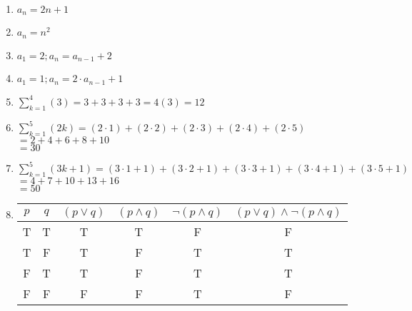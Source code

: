     \begin{enumerate}
        \item   $a_{n} = 2n+1$
        \item   $a_{n} = n^{2}$
        \item   $a_{1} = 2; a_{n} = a_{n-1} + 2$
        \item   $a_{1} = 1; a_{n} = 2 \cdot a_{n-1} + 1$
        
        \item   $ \sum_{k=1}^{4}(3) = 3 + 3 + 3 + 3 = 4(3) = 12$
        
        \item   $ \sum_{k=1}^{5}(2k) = (2 \cdot 1) + (2 \cdot 2) + (2 \cdot 3) + (2 \cdot 4) + (2 \cdot 5) $ \\
                $ = 2 + 4 + 6 + 8 + 10$ \\ $= 30$
        
        \item   $ \sum_{k=1}^{5}(3k+1) = (3 \cdot 1 + 1) + (3 \cdot 2 + 1) + (3 \cdot 3 + 1) + (3 \cdot 4 + 1) + (3 \cdot 5 + 1)$ \\
                $ = 4 + 7 + 10 + 13 + 16 $ \\ $ = 50$

        \item   
            \begin{tabular}{c c | c | c | c | c}
                $p$ & $q$
                    & $(p \lor q)$
                    & $(p \land q)$
                    & $\neg (p \land q)$
                    & $(p \lor q) \land \neg (p \land q)$
                \\ \hline
                T & T &     T &    T  &     F &     F
                \\
                T & F &     T &    F  &     T &     T
                \\
                F & T &     T &    F  &     T &     T
                \\
                F & F &     F &    F  &     T &     F
            \end{tabular}


\end{enumerate}
